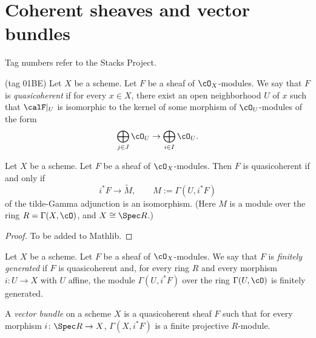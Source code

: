 \section{Coherent sheaves and vector bundles}

Tag numbers refer to the Stacks Project.

\begin{definition}
\label{def:quasicoherent}
\mathlibok
(tag 01BE)
Let $X$ be a scheme. Let $F$ be a sheaf of $\cO_X$-modules.
We say that $F$ is \emph{quasicoherent} if for every $x \in X$,
there exist an open neighborhood $U$ of $x$ such that $\calF|_U$ is isomorphic to the kernel
of some morphism of $\cO_U$-modules of the form
\[
\bigoplus_{j \in J} \cO_U \to \bigoplus_{i \in I} \cO_U.
\]
\end{definition}

\begin{lemma} \label{lem:quasicoherent on affine}
Let $X$ be a scheme. Let $F$ be a sheaf of $\cO_X$-modules.
Then $F$ is quasicoherent if and only if 
\[
i^* F \to \tilde{M}, \qquad M := \Gamma(U, i^* F)
\]
of the tilde-Gamma adjunction is an isomorphism.
(Here $M$ is a module over the ring $R = \Gamma(X, \cO)$, and $X \cong \Spec R$.)
\end{lemma}
\begin{proof}
To be added to Mathlib.
\end{proof}

\begin{definition} \label{def:finitely generated}
Let $X$ be a scheme. Let $F$ be a sheaf of $\cO_X$-modules.
We say that $F$ is \emph{finitely generated} if $F$ is quasicoherent and,
for every ring $R$ and every morphism 
$i \colon U \to X$ with $U$ affine, the module $\Gamma(U, i^*F)$ over the ring $\Gamma(U, \cO)$ is finitely generated.
\end{definition}

\begin{definition} \label{def:vector bundles}
A \emph{vector bundle} on a scheme $X$ is a quasicoherent sheaf $F$ such that for every morphism 
$i \colon \Spec R \to X$, $\Gamma(X, i^* F)$ is a finite projective $R$-module. 
\end{definition}


